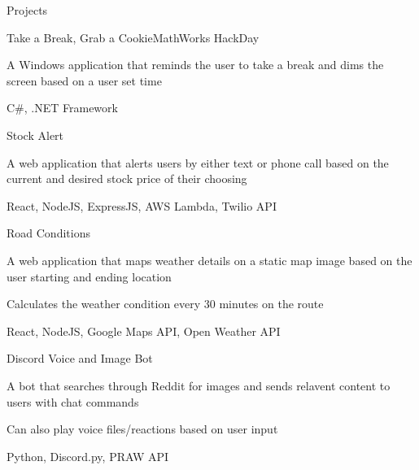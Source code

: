 \documentclass{resume} %
\begin{document}
\begin{rSection}{Projects}

    \begin{rSubsection}{Take a Break, Grab a Cookie}{}{MathWorks HackDay}{}
        \item A Windows application that reminds the user to take a break and dims the screen based on a user set time
        \item C\#, .NET Framework
    \end{rSubsection}

    \begin{rSubsection}{Stock Alert}{}{}{}
        \item A web application that alerts users by either text or phone call based on the current and desired stock price of their choosing
        \item React, NodeJS, ExpressJS, AWS Lambda, Twilio API
    \end{rSubsection}


    \begin{rSubsection}{Road Conditions}{}{}{}

        \item A web application that maps weather details on a static map image based on the user starting and ending location
        \item Calculates the weather condition every 30 minutes on the route
        \item React, NodeJS, Google Maps API, Open Weather API
    \end{rSubsection}


    \begin{rSubsection}{Discord Voice and Image Bot}{}{}{}

        \item A bot that searches through Reddit for images and sends relavent content to users with chat commands
        \item Can also play voice files/reactions based on user input
        \item Python, Discord.py, PRAW API
    \end{rSubsection}

\end{rSection}
\end{document}
